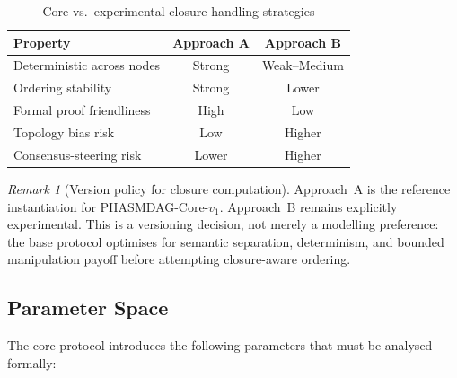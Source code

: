 \documentclass[11pt]{article}
\theoremstyle{definition}
\theoremstyle{plain}
\theoremstyle{remark}
\newtheorem{remark}[definition]{Remark}
\begin{document}
\begin{table}[t]
\centering
\caption{Core vs.\ experimental closure-handling strategies}
\label{tab:closure_approaches}
\begin{tabular}{@{}lcc@{}}
\toprule
\textbf{Property} & \textbf{Approach A} & \textbf{Approach B} \\
\midrule
Deterministic across nodes & Strong & Weak--Medium \\
Ordering stability & Strong & Lower \\
Formal proof friendliness & High & Low \\
Topology bias risk & Low & Higher \\
Consensus-steering risk & Lower & Higher \\
\bottomrule
\end{tabular}
\end{table}

\begin{remark}[Version policy for closure computation]\label{rem:closure_approaches}
Approach~A is the reference instantiation for PHASMDAG-Core-$v_1$.
Approach~B remains explicitly experimental.
This is a versioning decision, not merely a modelling preference:
the base protocol optimises for semantic separation, determinism, and bounded
manipulation payoff before attempting closure-aware ordering.
\end{remark}

\subsection{Parameter Space}

The core protocol introduces the following parameters that must be analysed formally:
\end{document}
